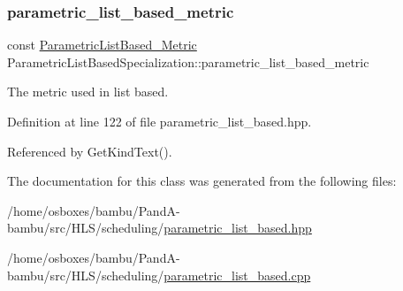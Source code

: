 \subsubsection{\texorpdfstring{parametric\+\_\+list\+\_\+based\+\_\+metric}{parametric\_list\_based\_metric}}
{\footnotesize\ttfamily const \hyperlink{parametric__list__based_8hpp_af0e38be9a93de210a888144f6a52e498}{Parametric\+List\+Based\+\_\+\+Metric} Parametric\+List\+Based\+Specialization\+::parametric\+\_\+list\+\_\+based\+\_\+metric}



The metric used in list based. 



Definition at line 122 of file parametric\+\_\+list\+\_\+based.\+hpp.



Referenced by Get\+Kind\+Text().



The documentation for this class was generated from the following files\+:\begin{DoxyCompactItemize}
\item 
/home/osboxes/bambu/\+Pand\+A-\/bambu/src/\+H\+L\+S/scheduling/\hyperlink{parametric__list__based_8hpp}{parametric\+\_\+list\+\_\+based.\+hpp}\item 
/home/osboxes/bambu/\+Pand\+A-\/bambu/src/\+H\+L\+S/scheduling/\hyperlink{parametric__list__based_8cpp}{parametric\+\_\+list\+\_\+based.\+cpp}\end{DoxyCompactItemize}
